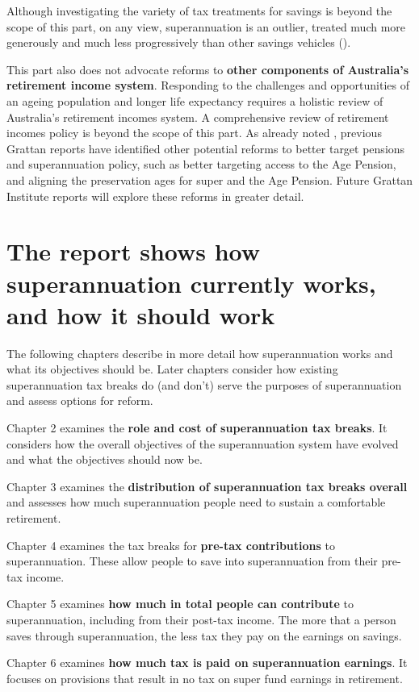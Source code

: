 Although investigating the variety of tax treatments for savings is beyond the scope of this part, on any view, superannuation is an outlier, treated much more generously and much less progressively than other savings vehicles ().

This part also does not advocate reforms to \textbf{other components of Australia’s retirement income system}. Responding to the challenges and opportunities of an ageing population and longer life expectancy requires a holistic review of Australia’s retirement incomes system. A comprehensive review of retirement incomes policy is beyond the scope of this part. As already noted , previous Grattan reports have identified other potential reforms to better target pensions and superannuation policy, such as better targeting access to the Age Pension, and aligning the preservation ages for super and the Age Pension. Future Grattan Institute reports will explore these reforms in greater detail. 

\section{{The report shows how superannuation currently works, and how it should work}}
The following chapters describe in more detail how superannuation works and what its objectives should be. Later chapters consider how existing superannuation tax breaks do (and don’t) serve the purposes of superannuation and assess options for reform.

Chapter 2 examines the \textbf{role and cost of superannuation tax breaks}. It considers how the overall objectives of the superannuation system have evolved and what the objectives should now be.

Chapter 3 examines the \textbf{distribution of superannuation tax breaks overall} and assesses how much superannuation people need to sustain a comfortable retirement.  

Chapter 4 examines the tax breaks for \textbf{pre-tax contributions} to superannuation. These allow people to save into superannuation from their pre-tax income.

Chapter 5 examines \textbf{how much in total people can contribute} to superannuation, including from their post-tax income. The more that a person saves through superannuation, the less tax they pay on the earnings on savings.

Chapter 6 examines \textbf{how much tax is paid on superannuation earnings}. It focuses on provisions that result in no tax on super fund earnings in retirement.

